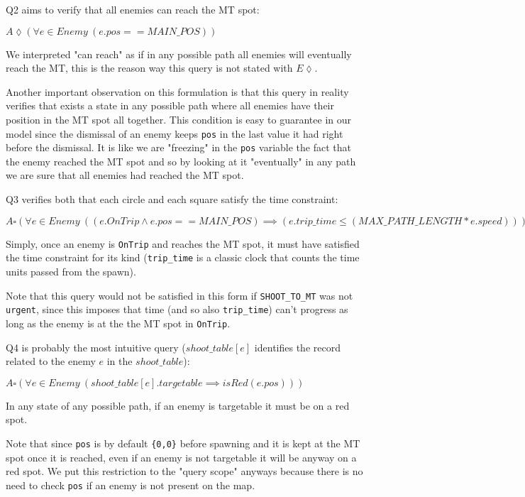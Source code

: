 \documentclass[
10pt, %
a4paper, %
oneside, %
headinclude,footinclude, %
BCOR5mm, %
]{scrartcl}
\begin{document}
				Q2 aims to verify that all enemies can reach the MT spot:
				\begin{center}
					$A\lozenge(\forall e \in Enemy\ (e.pos==MAIN\_POS))$
				\end{center}
				We interpreted "can reach" as if in any possible path all enemies will eventually reach the MT, this is the reason way this query is not stated with $E\lozenge$.
				
				Another important observation on this formulation is that this query in reality verifies that exists a state in any possible path where all enemies have their position in the MT spot all together. This condition is easy to guarantee in our model since the dismissal of an enemy keeps \texttt{pos} in the last value it had right before the dismissal. It is like we are "freezing" in the \texttt{pos} variable the fact that the enemy reached the MT spot and so by looking at it "eventually" in any path we are sure that all enemies had reached the MT spot.
				
				Q3 verifies both that each circle and each square satisfy the time constraint:
				\begin{center}
					$A\square(\forall e \in Enemy\ ((e.OnTrip \wedge e.pos==MAIN\_POS) \implies (e.trip\_time\leq(MAX\_PATH\_LENGTH*e.speed))))$
				\end{center}
				Simply, once an enemy is \texttt{OnTrip} and reaches the MT spot, it must have satisfied the time constraint for its kind (\texttt{trip\_time} is a classic clock that counts the time units passed from the spawn).
				
				Note that this query would not be satisfied in this form if \texttt{SHOOT\_TO\_MT} was not \texttt{urgent}, since this imposes that time (and so also \texttt{trip\_time}) can't progress as long as the enemy is at the the MT spot in \texttt{OnTrip}.
				
				Q4 is probably the most intuitive query ($shoot\_table[e]$ identifies the record related to the enemy $e$ in the $shoot\_table$):
				\begin{center}
					$A\square(\forall e \in Enemy\ (shoot\_table[e].targetable \implies isRed(e.pos)))$
				\end{center}
				In any state of any possible path, if an enemy is targetable it must be on a red spot.
				
				Note that since \texttt{pos} is by default \texttt{\{0,0\}} before spawning and it is kept at the MT spot once it is reached, even if an enemy is not targetable it will be anyway on a red spot. We put this restriction to the "query scope" anyways because there is no need to check \texttt{pos} if an enemy is not present on the map. 
\end{document}
